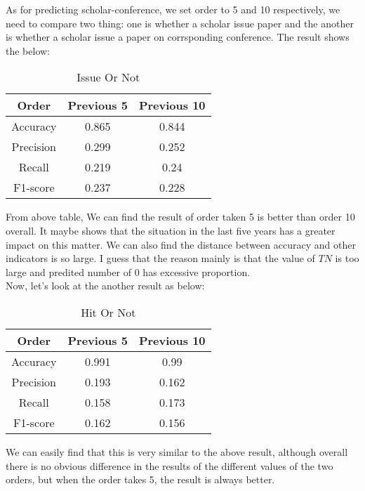 \documentclass[conference]{IEEEtran}
\begin{document}
As for predicting scholar-conference, we set order to 5 and 10 respectively, we need to compare two thing: one is whether a scholar issue paper and the another is whether a scholar issue a paper on corrsponding conference. The result shows the below:
\renewcommand\arraystretch{1.5}
\begin{table}[htbp]
		\centering
		\begin{tabular}{c|c|c}
			\hline \hline
			 Order & Previous 5 & Previous 10 \\ 
			\hline 
			Accuracy  & 0.865 & 0.844 \\

			Precision & 0.299 & 0.252 \\ 

			Recall    & 0.219 & 0.24 \\ 
			
			F1-score  &  0.237& 0.228 \\\hline
		\end{tabular} 
		\caption{Issue Or Not}
\end{table}

From above table, We can find the result of order taken 5 is better than  order 10 overall. It maybe shows that the situation in the last five years has a greater impact on this matter. We can also find the distance  between accuracy and other indicators is so large. I guess that the reason mainly is that the value of $TN$ is too large and predited number of $0$ has excessive proportion.\\

Now, let's look at the another result as below:
\renewcommand\arraystretch{1.5}
\begin{table}[htbp]
		\centering
		\begin{tabular}{c|c|c}
			\hline \hline
			 Order & Previous 5 & Previous 10 \\ 
			\hline 
			Accuracy  & 0.991 & 0.99 \\

			Precision & 0.193 & 0.162 \\ 

			Recall    & 0.158 &  0.173\\ 
			
			F1-score  &  0.162&  0.156 \\\hline
		\end{tabular} 
		\caption{Hit Or Not}
\end{table}
We can easily find that this is very similar to the above result, although overall there is no obvious difference in the results of the different values of the two orders, but when the order takes 5, the result is always better.
\end{document}
